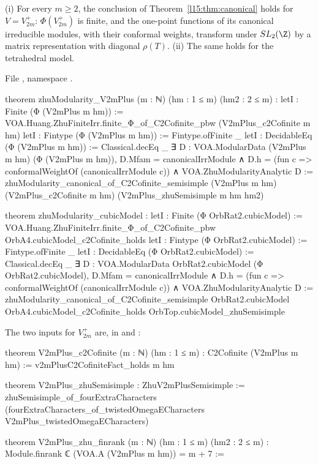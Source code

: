 \begin{theorem}\label{l15:thm:instances}
(i) For every $m\ge2$, the conclusion of Theorem~\ref{l15:thm:canonical} holds for $V=V_{2m}^+$: $\Phi(V_{2m}^+)$ is finite, and
the one-point functions of its canonical irreducible modules, with their conformal weights, transform under $\lfifteenSL$ by a
matrix representation with diagonal $\rho(T)$. (ii) The same holds for the tetrahedral model.
\end{theorem}
\noindent File ,
namespace .
\begin{leancode}
theorem zhuModularity_V2mPlus (m : ℕ) (hm : 1 ≤ m) (hm2 : 2 ≤ m) :
    letI : Finite (Φ (V2mPlus m hm)) :=
      VOA.Huang.ZhuFiniteIrr.finite_Φ_of_C2Cofinite_pbw (V2mPlus_c2Cofinite m hm)
    letI : Fintype (Φ (V2mPlus m hm)) := Fintype.ofFinite _
    letI : DecidableEq (Φ (V2mPlus m hm)) := Classical.decEq _
    ∃ D : VOA.ModularData (V2mPlus m hm) (Φ (V2mPlus m hm)), D.Mfam = canonicalIrrModule ∧
      D.h = (fun c => conformalWeightOf (canonicalIrrModule c)) ∧ VOA.ZhuModularityAnalytic D :=
  zhuModularity_canonical_of_C2Cofinite_semisimple (V2mPlus m hm) (V2mPlus_c2Cofinite m hm)
    (V2mPlus_zhuSemisimple m hm hm2)

theorem zhuModularity_cubicModel :
    letI : Finite (Φ OrbRat2.cubicModel) :=
      VOA.Huang.ZhuFiniteIrr.finite_Φ_of_C2Cofinite_pbw OrbA4.cubicModel_c2Cofinite_holds
    letI : Fintype (Φ OrbRat2.cubicModel) := Fintype.ofFinite _
    letI : DecidableEq (Φ OrbRat2.cubicModel) := Classical.decEq _
    ∃ D : VOA.ModularData OrbRat2.cubicModel (Φ OrbRat2.cubicModel),
      D.Mfam = canonicalIrrModule ∧
      D.h = (fun c => conformalWeightOf (canonicalIrrModule c)) ∧ VOA.ZhuModularityAnalytic D :=
  zhuModularity_canonical_of_C2Cofinite_semisimple OrbRat2.cubicModel
    OrbA4.cubicModel_c2Cofinite_holds OrbTop.cubicModel_zhuSemisimple
\end{leancode}
\noindent The two inputs for $V_{2m}^+$ are, in 
and :
\begin{leancode}
theorem V2mPlus_c2Cofinite (m : ℕ) (hm : 1 ≤ m) : C2Cofinite (V2mPlus m hm) :=
  v2mPlusC2CofiniteFact_holds m hm

theorem V2mPlus_zhuSemisimple : ZhuV2mPlusSemisimple :=
  zhuSemisimple_of_fourExtraCharacters
    (fourExtraCharacters_of_twistedOmegaECharacters V2mPlus_twistedOmegaECharacters)

theorem V2mPlus_zhu_finrank (m : ℕ) (hm : 1 ≤ m) (hm2 : 2 ≤ m) :
    Module.finrank ℂ (VOA.A (V2mPlus m hm)) = m + 7 :=
\end{leancode}
